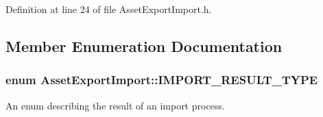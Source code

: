 Definition at line 24 of file Asset\-Export\-Import.\-h.



\subsection{Member Enumeration Documentation}
\hypertarget{class_asset_export_import_aca4cd77d57caadb60bc50edc33ca3d9e}{
\subsubsection[{I\-M\-P\-O\-R\-T\-\_\-\-R\-E\-S\-U\-L\-T\-\_\-\-T\-Y\-P\-E}]{\setlength{\rightskip}{0pt plus 5cm}enum {\bf Asset\-Export\-Import\-::\-I\-M\-P\-O\-R\-T\-\_\-\-R\-E\-S\-U\-L\-T\-\_\-\-T\-Y\-P\-E}}}\label{class_asset_export_import_aca4cd77d57caadb60bc50edc33ca3d9e}


An enum describing the result of an import process. 

